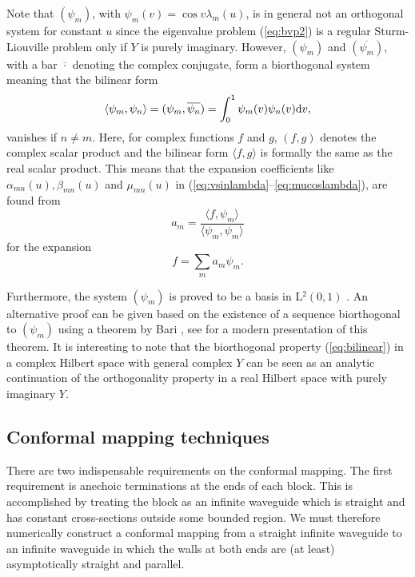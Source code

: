 \documentclass[numreferences]{kluwer}
\begin{document}
Note that $(\psi_m)$, with $\psi_m(v)=\cos v\lambda_m(u)$, is in
general not an orthogonal system for constant $u$ since the eigenvalue
problem (\ref{eq:bvp2}) is a regular Sturm-Liouville problem only if
$Y$ is purely imaginary. However, $(\psi_m)$ and
$(\overline{\psi_m})$, with a bar $\overline{\cdot}$ denoting the
complex conjugate, form a biorthogonal system meaning that the
bilinear form
\begin{equation}\label{eq:bilinear}
  \langle \psi_m,\psi_n\rangle
  =(\psi_m,\overline{\psi_n})
  =\int_0^1\psi_m(v)\psi_n(v){\rm d}v,
\end{equation}
vanishes if $n\neq m$. Here, for complex functions $f$ and $g$,
$(f,g)$ denotes the complex scalar product and the bilinear form
$\langle f,g \rangle$ is formally the same as the real scalar
product. This means that the expansion coefficients like
$\alpha_{mn}(u),\beta_{mn}(u)$ and $\mu_{mn}(u)$ in
(\ref{eq:vsinlambda}--\ref{eq:mucoslambda}), are found from
\begin{equation}\label{eq:am}
  a_m=\frac{\langle f,\psi_m \rangle}
  {\langle \psi_m,\psi_m \rangle}
\end{equation}
for the expansion
\begin{equation}\label{eq:expansion}
  f=\sum_m a_m \psi_m.
\end{equation}

Furthermore, the system $(\psi_m)$ is proved to be a basis in
L$^2(0,1)$ \cite{Schwartz:1954}. An alternative proof can be given
based on the existence of a sequence biorthogonal to $(\psi_m)$
using a theorem by Bari \cite{Bari:1944}, see \cite{Christensson:2003}
for a modern presentation of this theorem. It is interesting to note
that the biorthogonal property (\ref{eq:bilinear}) in a complex
Hilbert space with general complex $Y$ can be seen as an analytic
continuation of the orthogonality property in a real Hilbert space
with purely imaginary $Y$.

\subsection{Conformal mapping techniques}
\label{sec:confmap}

There are two indispensable requirements on the conformal mapping. The
first requirement is anechoic terminations at the ends of each
block. This is accomplished by treating the block as an infinite
waveguide which is straight and has constant cross-sections outside
some bounded region. We must therefore numerically construct a
conformal mapping from a straight infinite waveguide to an infinite
waveguide in which the walls at both ends are (at least)
asymptotically straight and parallel.
\end{document}
